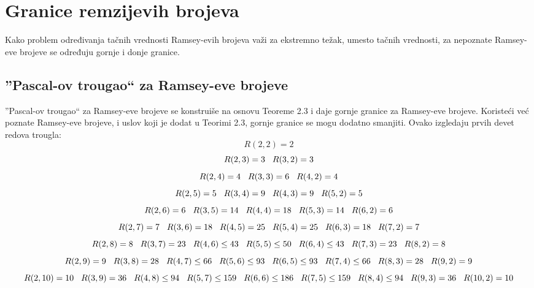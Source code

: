 \documentclass[12pt,a4paper]{article}
\begin{document}
	\section{Granice remzijevih brojeva}
	Kako problem određivanja tačnih vrednosti Ramsey-evih brojeva važi za ekstremno težak, umesto tačnih vrednosti, za nepoznate Ramsey-eve brojeve se određuju gornje i donje granice.
	\subsection{''Pascal-ov trougao`` za  Ramsey-eve brojeve}
	''Pascal-ov trougao`` za  Ramsey-eve brojeve se konstruiše na osnovu Teoreme 2.3 i daje gornje granice za Ramsey-eve brojeve. Koristeći već poznate Ramsey-eve brojeve, i uslov koji je dodat u Teorimi 2.3, gornje granice se mogu dodatno smanjiti.
	\newpage
	Ovako izgledaju prvih devet redova trougla:
	\tiny 
\[R(2,2)=2\]
\[R(2,3)=3\hspace{0.3cm}R(3,2)=3\]
\[R(2,4)=4\hspace{0.3cm}R(3,3)=6\hspace{0.3cm}R(4,2)=4\]
\[R(2,5)=5\hspace{0.3cm}R(3,4)=9\hspace{0.3cm}R(4,3)=9\hspace{0.3cm}R(5,2)=5\]
\[R(2,6)=6\hspace{0.3cm}R(3,5)=14\hspace{0.3cm}R(4,4)=18\hspace{0.3cm}R(5,3)=14\hspace{0.3cm}R(6,2)=6\]
\[R(2,7)=7\hspace{0.3cm}R(3,6)=18\hspace{0.3cm}R(4,5)=25\hspace{0.3cm}R(5,4)=25\hspace{0.3cm}R(6,3)=18\hspace{0.3cm}R(7,2)=7\]
\[R(2,8)=8\hspace{0.3cm}R(3,7)=23\hspace{0.3cm}R(4,6)\leq 43\hspace{0.3cm}R(5,5)\leq 50\hspace{0.3cm}R(6,4)\leq 43\hspace{0.3cm}R(7,3)=23\hspace{0.3cm}R(8,2)=8\]
\[R(2,9)=9\hspace{0.3cm}R(3,8)=28\hspace{0.3cm}R(4,7)\leq 66\hspace{0.3cm}R(5,6)\leq 93\hspace{0.3cm}R(6,5)\leq 93\hspace{0.3cm}R(7,4)\leq 66\hspace{0.3cm}R(8,3)=28\hspace{0.3cm}R(9,2)=9\]
\[R(2,10)=10\hspace{0.3cm}R(3,9)=36\hspace{0.3cm}R(4,8)\leq 94\hspace{0.3cm}R(5,7)\leq 159\hspace{0.3cm}R(6,6)\leq 186\hspace{0.3cm}R(7,5)\leq 159\hspace{0.3cm}R(8,4)\leq 94\hspace{0.3cm}R(9,3)=36\hspace{0.3cm}R(10,2)=10\]
\normalsize
\end{document}
